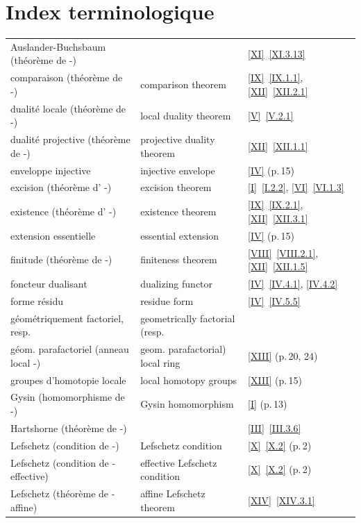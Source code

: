\chapter*{Index terminologique}

\begin{footnotesize}
\noindent
\begin{tabular}{lll}
Auslander-Buchsbaum (th\'eor\`eme de -) & & \ref{XI}~\ref{XI.3.13}\\
comparaison (th\'eor\`eme de -) & comparison theorem & \ref{IX}~\ref{IX.1.1}, \ref{XII}~\ref{XII.2.1}\\
dualit\'e locale (th\'eor\`eme de -) & local duality theorem & \ref{V}~\ref{V.2.1}\\
dualit\'e projective (th\'eor\`eme de -) & projective duality theorem & \ref{XII}~\ref{XII.1.1} \\
enveloppe injective & injective envelope & \ref{IV} (p.\,15)\\
excision (th\'eor\`eme d' -) & excision theorem & \ref{I}~\ref{I.2.2}, \ref{VI}~\ref{VI.1.3}\\
existence (th\'eor\`eme d' -) & existence theorem & \ref{IX}~\ref{IX.2.1}, \ref{XII}~\ref{XII.3.1}\\
extension essentielle & essential extension & \ref{IV} (p.\,15)\\
finitude (th\'eor\`eme de -) & finiteness theorem & \ref{VIII}~\ref{VIII.2.1}, \ref{XII}~\ref{XII.1.5}\\
foncteur dualisant & dualizing functor & \ref{IV}~\ref{IV.4.1}, \ref{IV.4.2}\\
forme r\'esidu & residue form & \ref{IV}~\ref{IV.5.5}\\
g\'eom\'etriquement factoriel, resp. & geometrically factorial (resp. &\\
g\'eom. parafactoriel (anneau local -) & geom. parafactorial) local ring & \ref{XIII} (p.\,20, 24)\\
groupes d'homotopie locale & local homotopy groups & \ref{XIII} (p.\,15)\\
Gysin (homomorphisme de -) & Gysin homomorphism & \ref{I} (p.\,13)\\
Hartshorne (th\'eor\`eme de -) & & \ref{III}~\ref{III.3.6}\\
Lefschetz (condition de -) & Lefschetz condition & \ref{X}~\ref{X.2} (p.\,2)\\
Lefschetz (condition de - effective) & effective Lefschetz condition & \ref{X}~\ref{X.2} (p.\,2)\\
Lefschetz (th\'eor\`eme de - affine) & affine Lefschetz theorem & \ref{XIV}~\ref{XIV.3.1}\\

\end{tabular}
\end{footnotesize}
